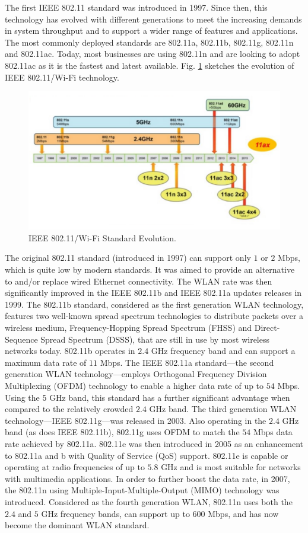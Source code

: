 The first IEEE 802.11 standard was introduced in 1997. Since then, this technology has evolved with different generations to meet the increasing demands in system throughput and to support a wider range of features and applications. The most commonly deployed standards are 802.11a, 802.11b, 802.11g, 802.11n and 802.11ac. Today, most businesses are using 802.11n and are looking to adopt 802.11ac as it is the fastest and latest available. Fig. \ref{figs:Wi-Fi-evolution} sketches the evolution of IEEE 802.11/Wi-Fi technology.
\begin{figure}[!ht]
	\centering
	\includegraphics[width=1.0\columnwidth]{figs/Wi-Fi-evolution.pdf}
	\caption{IEEE 802.11/Wi-Fi Standard Evolution.}
	\label{figs:Wi-Fi-evolution}
\end{figure}
The original 802.11 standard (introduced in 1997) can support only $1$ or $2$ Mbps, which is quite low by modern standards. It was aimed to provide an alternative to and/or replace wired Ethernet connectivity. The WLAN rate was then significantly improved in the IEEE 802.11b and IEEE 802.11a updates releases in 1999. The 802.11b standard, considered as the first generation WLAN technology, features two well-known spread spectrum technologies to distribute packets over a wireless medium, Frequency-Hopping Spread Spectrum (FHSS) and Direct-Sequence Spread Spectrum (DSSS), that are still in use by most wireless networks today. 802.11b operates in $2.4$ GHz frequency band and can support a maximum data rate of $11$ Mbps. The IEEE 802.11a standard---the second generation WLAN technology---employs Orthogonal Frequency Division Multiplexing (OFDM) technology to enable a higher data rate of up to $54$ Mbps. Using the $5$ GHz band, this standard has a further significant advantage when compared to the relatively crowded $2.4$ GHz band. The third generation WLAN technology---IEEE 802.11g---was released in 2003. Also operating in the $2.4$ GHz band (as does IEEE 802.11b),  802.11g uses OFDM to match the $54$ Mbps data rate achieved by 802.11a. 802.11e was then introduced in 2005 as an enhancement to 802.11a and b with Quality of Service (QoS) support. 802.11e is capable or operating at radio frequencies of up to $5.8$ GHz and is most suitable for networks with multimedia applications. In order to further boost the data rate, in 2007, the 802.11n using Multiple-Input-Multiple-Output (MIMO) technology was introduced. Considered as the fourth generation WLAN, 802.11n uses both the $2.4$ and $5$ GHz frequency bands, can support up to $600$ Mbps, and has now become the dominant WLAN standard.

